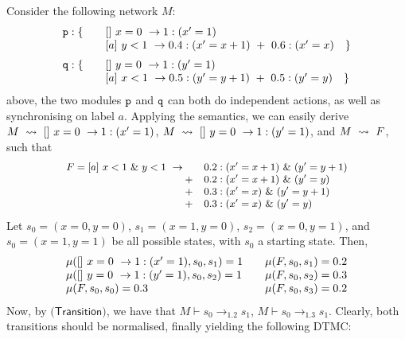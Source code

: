 \begin{example}
  Consider the following network $M$:
  \begin{displaymath}
    \begin{array}{llll}
      \role{p}: \{ & \quad \commandBase {}{x=0} {1:(x'=1)}\\
                   & \quad \commandBase {a}{y<1} {0.4: (x'=x+1)\ +\ 0.6: (x'=x)}\quad \}\\[2mm]
      \role{q}: \{ & \quad \commandBase {}{y=0} {1:(y'=1)}\\
                   & \quad \commandBase {a}{x<1} {0.5: (y'=y+1)\ +\ 0.5: (y'=y)}\quad \}\\
    \end{array}
  \end{displaymath}
  above, the two modules $\mathtt{p}$ and $\mathtt{q}$ can both do
  independent actions, as well as synchronising on label $a$. Applying
  the semantics, we can easily derive
  $M\ \stackrel{}{\rightsquigarrow}\ []\ x=0\ \rightarrow 1:(x'=1)$,
  $M\ \stackrel{}{\rightsquigarrow}\ []\ y=0\ \rightarrow 1:(y'=1)$, and $M\ \stackrel{}{\rightsquigarrow}\ F$,
  such that
  \begin{displaymath}\small
    \begin{array}{rlll}
      F=\commandBase {a}{x<1\ \&\ y<1} {\quad} & 0.2: (x'=x+1)\ \&\ (y'=y+1)\\
                                       + & 0.2: (x'=x+1)\ \&\ (y'=y)\\
                                       + & 0.3: (x'=x)\ \&\ (y'=y+1)\\
                                       + & 0.3: (x'=x)\ \&\ (y'=y)\\
    \end{array}
  \end{displaymath}  
  Let $s_0=(x=0,y=0)$, $s_1=(x=1,y=0)$, $s_2=(x=0,y=1)$, and
  $s_0=(x=1,y=1)$ be all possible states, with $s_0$ a starting
  state. Then, %
  \begin{displaymath}
    \begin{array}{lr}
      \mu([]\ x=0\ \rightarrow 1:(x'=1), s_0, s_1) = 1 & \quad \mu(F, s_0, s_1) = 0.2\\
      \mu([]\ y=0\ \rightarrow 1:(y'=1), s_0, s_2) = 1 & \quad\mu(F, s_0, s_2) = 0.3\\ 
      \mu(F, s_0, s_0) = 0.3 & \quad\mu(F, s_0, s_3) = 0.2\\
    \end{array}
  \end{displaymath}  
  Now, by $\textsf{(Transition)}$, we have that
  $M\vdash s_0\rightarrow_{1.2} s_1$,
  $M\vdash s_0\rightarrow_{1.3} s_1$. Clearly, both transitions should
  be normalised, finally yielding the following DTMC:
\begin{comment}
  \begin{tikzpicture}\small
    \node[state, initial] (1) 
    {\tiny $s_0$};


\end{comment}
\end{example}
